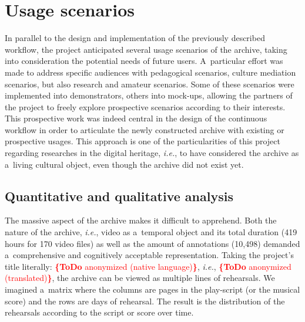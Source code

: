 \documentclass[conference]{IEEEtran}
\newcommand{\todo}[1]{\noindent\textcolor{red}{{\bf \{ToDo} #1{\bf \}}}}
\begin{document}
\section{Usage scenarios}
\label{sec:scenarios}
In parallel to the design and implementation of the previously described workflow, the project anticipated several usage scenarios of the archive, taking into consideration the potential needs of future users. A~particular effort was made to address specific audiences with pedagogical scenarios, culture mediation scenarios, but also research and amateur scenarios. Some of these scenarios were implemented into demonstrators, others into mock-ups, allowing the partners of the project to freely explore prospective scenarios according to their interests. This prospective work was indeed central in the design of the continuous workflow in order to articulate the newly constructed archive with existing or prospective usages. This approach is one of the particularities of this project regarding researches in the digital heritage, \emph{i.e.}, to have considered the archive as a~living cultural object, even though the archive did not exist yet.

\subsection{Quantitative and qualitative analysis}
The massive aspect of the archive makes it difficult to apprehend. Both the nature of the archive, \emph{i.e.}, video as a~temporal object\cite{stiegler98}  and its total duration (419 hours for 170 video files) as well as the amount of annotations (10,498) demanded a~comprehensive and cognitively acceptable representation. Taking the project's title literally:
\todo{anonymized (native language)}, \emph{i.e.},
\todo{anonymized (translated)},
the archive can be viewed as multiple lines of rehearsals. We imagined a~matrix where the columns are pages in the play-script  (or the musical score) and the rows are days of rehearsal. The result is the distribution of the rehearsals according to the script or score over time.

\end{document}
